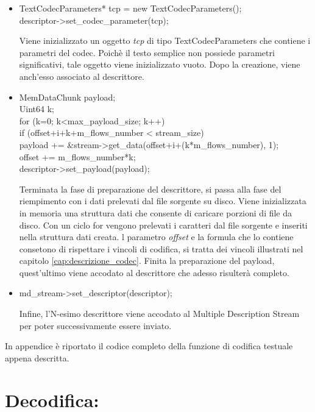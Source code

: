 \begin{itemize}
 \item \begin{code}
TextCodecParameters* tcp = new TextCodecParameters();\\
descriptor->set\_codec\_parameter(tcp);\\
\end{code}
Viene inizializzato un oggetto \textit{tcp} di tipo TextCodecParameters che contiene i parametri del codec. Poich\`e il testo semplice non possiede parametri significativi, tale oggetto viene inizializzato vuoto. Dopo la creazione, viene anch'esso associato al descrittore.

 \item \begin{code}
MemDataChunk payload;\\
Uint64 k;\\
for (k=0; k<max\_payload\_size; k++)\\
	if (offset+i+k+m\_flows\_number < stream\_size)\\
		payload += \&stream->get\_data(offset+i+(k*m\_flows\_number), 1);\\
offset += m\_flows\_number*k;\\
descriptor->set\_payload(payload);\\
\end{code}
Terminata la fase di preparazione del descrittore, si passa alla fase del riempimento con i dati prelevati dal file sorgente su disco. Viene inizializzata in memoria una struttura dati che consente di caricare porzioni di file da disco. Con un ciclo for vengono prelevati i caratteri dal file sorgente e inseriti nella struttura dati creata. l parametro \textit{offset} e la formula che lo contiene consetono di rispettare i vincoli di codifica, si tratta dei vincoli illustrati nel capitolo \ref{cap:descrizione_codec}. Finita la preparazione del payload, quest'ultimo viene accodato al descrittore che adesso risulter\`a completo.

 \item \begin{code}
md\_stream->set\_descriptor(descriptor);\\
\end{code}
Infine, l'N-esimo descrittore viene accodato al Multiple Description Stream per poter successivamente essere inviato.
\end{itemize}
In appendice \`e riportato il codice completo della funzione di codifica testuale appena descritta.

\section{Decodifica:}


